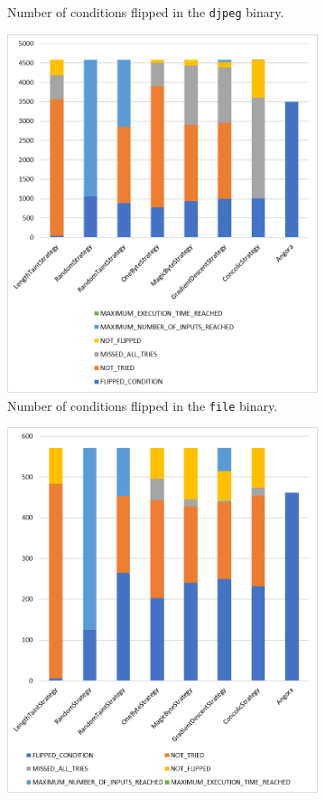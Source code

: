 \begin{figure}[H]
\begin{subfigure}[b]{0.49\textwidth}
        \caption{Number of conditions flipped in the  \texttt{djpeg} binary.}
        \label{fig:djpegStatus}
    \end{subfigure}
    \hfill
    \begin{subfigure}[b]{0.49\textwidth}
        \centering
        \includegraphics[width=.8\linewidth]{5_results/graphs/file-status.png}  
        \caption{Number of conditions flipped in the  \texttt{file} binary.}
        \label{fig:fileStatus}
    \end{subfigure}
    \hfill
    \begin{subfigure}[b]{0.49\textwidth}
        \centering
        \includegraphics[width=.8\linewidth]{5_results/graphs/gif2png-status.png}  

\end{subfigure}
\end{figure}

